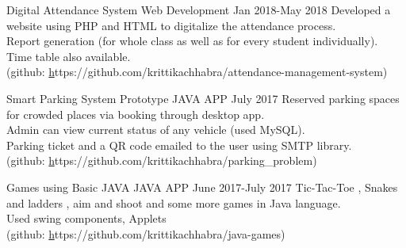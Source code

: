    
\begin{entryzlist}
\entryz

{Digital Attendance System {\normalfont Web Development }}
{Jan 2018-May 2018}
{Developed a website using PHP and HTML to digitalize the attendance process. 
\\
Report generation (for whole class as well as for every student individually).
\\
Time table also available.
\\
(github: \href{https://github.com/krittikachhabra/attendance-management-system}https://github.com/krittikachhabra/attendance-management-system)}

\entryz

{Smart Parking System Prototype {\normalfont JAVA APP }}
{July 2017}
{Reserved parking spaces for crowded places via booking through desktop 
app.
\\
Admin can view current status of any vehicle (used MySQL). 
\\
Parking ticket and a QR code emailed to the user using SMTP library.
\\
(github: \href{https://github.com/krittikachhabra/parking_problem}https://github.com/krittikachhabra/parking\_problem)}

\entryz

{Games using Basic JAVA {\normalfont JAVA APP }}
{June 2017-July 2017}
{Tic-Tac-Toe , Snakes and ladders , aim and shoot and some more games 
in Java language.
\\
Used swing components, Applets
\\
(github: \href{https://github.com/krittikachhabra/java-games}https://github.com/krittikachhabra/java-games)}


\end{entryzlist}